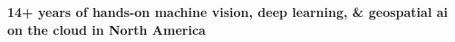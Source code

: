 \onehalfspace
\textbf{\large 14+ years of hands-on machine vision, deep learning, \& geospatial ai  on the cloud in North America}
\singlespace

\vspace{0.8cm}
